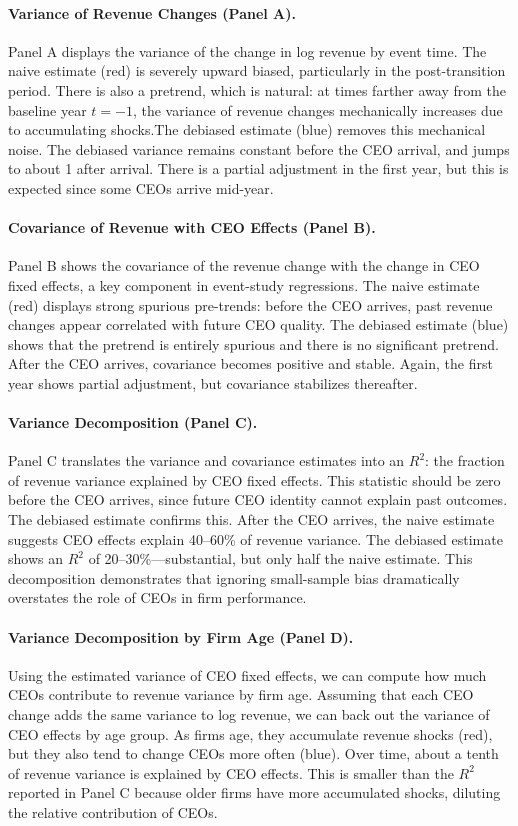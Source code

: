 \documentclass[11pt,a4paper]{article}
\begin{document}
\paragraph{Variance of Revenue Changes (Panel A).} Panel A displays the variance of the change in log revenue by event time. The naive estimate (red) is severely upward biased, particularly in the post-transition period. There is also a pretrend, which is natural: at times farther away from the baseline year $t=-1$, the variance of revenue changes mechanically increases due to accumulating shocks.The debiased estimate (blue) removes this mechanical noise. The debiased variance remains constant before the CEO arrival, and jumps to about 1 after arrival. There is a partial adjustment in the first year, but this is expected since some CEOs arrive mid-year. 

\paragraph{Covariance of Revenue with CEO Effects (Panel B).} Panel B shows the covariance of the revenue change with the change in CEO fixed effects, a key component in event-study regressions. The naive estimate (red) displays strong spurious pre-trends: before the CEO arrives, past revenue changes appear correlated with future CEO quality. The debiased estimate (blue) shows that the pretrend is entirely spurious and there is no significant pretrend. After the CEO arrives, covariance becomes positive and stable. Again, the first year shows partial adjustment, but covariance stabilizes thereafter. 

\paragraph{Variance Decomposition (Panel C).} Panel C translates the variance and covariance estimates into an $R^2$: the fraction of revenue variance explained by CEO fixed effects. This statistic should be zero before the CEO arrives, since future CEO identity cannot explain past outcomes. The debiased estimate confirms this. After the CEO arrives, the naive estimate suggests CEO effects explain 40--60\% of revenue variance. The debiased estimate shows an $R^2$ of 20--30\%---substantial, but only half the naive estimate. This decomposition demonstrates that ignoring small-sample bias dramatically overstates the role of CEOs in firm performance.

\paragraph{Variance Decomposition by Firm Age (Panel D).} Using the estimated variance of CEO fixed effects, we can compute how much CEOs contribute to revenue variance by firm age. Assuming that each CEO change adds the same variance to log revenue, we can back out the variance of CEO effects by age group. As firms age, they accumulate revenue shocks (red), but they also tend to change CEOs more often (blue). Over time, about a tenth of revenue variance is explained by CEO effects. This is smaller than the $R^2$ reported in Panel C because older firms have more accumulated shocks, diluting the relative contribution of CEOs.
\end{document}
